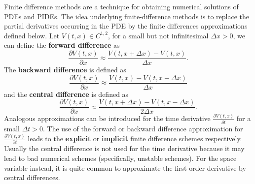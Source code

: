 Finite difference methods are a technique for obtaining numerical solutions of PDEs and PIDEs. 
The idea underlying finite-difference methods is to replace the partial derivatives occurring in the PDE by the finite differences approximations defined below.
Let $V(t,x) \in C^{1,2}$, for a small but not infinitesimal $\Delta x >0$, we can define the \textbf{forward difference} as
\begin{equation}
 \frac{\partial V(t,x)}{\partial x} \approx \frac{V(t,x+\Delta x) - V(t,x)}{\Delta x}.
\end{equation}
The \textbf{backward difference} is defined as
\begin{equation}
 \frac{\partial V(t,x)}{\partial x} \approx \frac{V(t,x) - V(t,x-\Delta x)}{\Delta x}
\end{equation}
and the \textbf{central difference} is defined as
\begin{equation}
 \frac{\partial V(t,x)}{\partial x} \approx \frac{V(t,x+\Delta x) - V(t,x-\Delta x)}{2 \Delta x}.
\end{equation}
Analogous approximations can be introduced for the time derivative $\frac{\partial V(t,x)}{\partial t}$ for a small $\Delta t > 0$.
The use of the forward or backward difference approximation for $\frac{\partial V(t,x)}{\partial t}$ leads to the \textbf{explicit} or \textbf{implicit} finite difference 
schemes respectively. Usually the central difference is not used for the time derivative because it may lead to bad numerical schemes (specifically, unstable schemes).
For the space variable instead, it is quite common to approximate the first order derivative by central differences.

